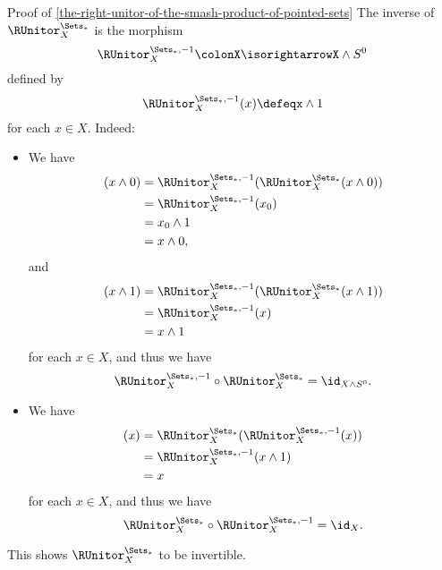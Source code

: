 \begin{Proof}{Proof of \cref{the-right-unitor-of-the-smash-product-of-pointed-sets}}
    The inverse of $\RUnitor^{\Sets_{*}}_{X}$ is the morphism
    \[
        \RUnitor^{\Sets_{*},-1}_{X}%
        \colon%
        X%
        \isorightarrow%
        X\wedge S^{0}%
    \]%
    defined by
    \[
        \RUnitor^{\Sets_{*},-1}_{X}(x)%
        \defeq%
        x\wedge 1
    \]%
    for each $x\in X$. Indeed:
    \begin{itemize}
        \item{}We have
            \begin{align*}
                [\RUnitor^{\Sets_{*},-1}_{X}\circ\RUnitor^{\Sets_{*}}_{X}](x\wedge 0) &= \RUnitor^{\Sets_{*},-1}_{X}(\RUnitor^{\Sets_{*}}_{X}(x\wedge 0))\\
                                                                                      &= \RUnitor^{\Sets_{*},-1}_{X}(x_{0})\\
                                                                                      &= x_{0}\wedge 1\\
                                                                                      &= x\wedge 0,
            \end{align*}
            and 
            \begin{align*}
                [\RUnitor^{\Sets_{*},-1}_{X}\circ\RUnitor^{\Sets_{*}}_{X}](x\wedge 1) &= \RUnitor^{\Sets_{*},-1}_{X}(\RUnitor^{\Sets_{*}}_{X}(x\wedge 1))\\
                                                                                      &= \RUnitor^{\Sets_{*},-1}_{X}(x)\\
                                                                                      &= x\wedge 1
            \end{align*}
            for each $x\in X$, and thus we have
            \[
                \RUnitor^{\Sets_{*},-1}_{X}%
                \circ%
                \RUnitor^{\Sets_{*}}_{X}%
                =%
                \id_{X\wedge S^{0}}.%
            \]%
        \item{}We have
            \begin{align*}
                [\RUnitor^{\Sets_{*}}_{X}\circ\RUnitor^{\Sets_{*},-1}_{X}](x) &= \RUnitor^{\Sets_{*}}_{X}(\RUnitor^{\Sets_{*},-1}_{X}(x))\\
                                                                              &= \RUnitor^{\Sets_{*},-1}_{X}(x\wedge 1)\\
                                                                              &= x
            \end{align*}
            for each $x\in X$, and thus we have
            \[
                \RUnitor^{\Sets_{*}}_{X}%
                \circ%
                \RUnitor^{\Sets_{*},-1}_{X}%
                =%
                \id_{X}.%
            \]%
    \end{itemize}
    This shows $\RUnitor^{\Sets_{*}}_{X}$ to be invertible.


\end{Proof}
